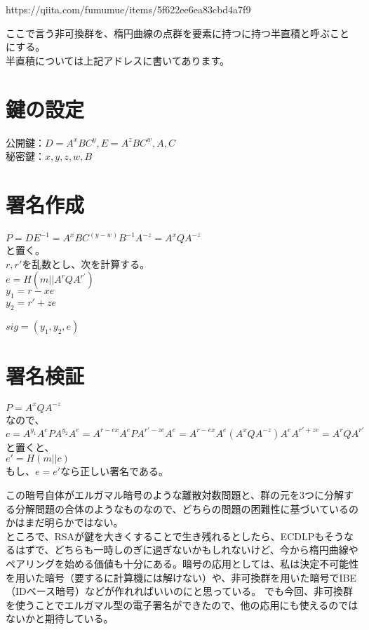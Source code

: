 \documentclass[
]{article}
\begin{document}
https://qiita.com/fumumue/items/5f622ee6ea83cbd4a7f9

ここで言う非可換群を、楕円曲線の点群を要素に持つに持つ半直積と呼ぶことにする。\\
半直積については上記アドレスに書いてあります。

\hypertarget{ux9375ux306eux8a2dux5b9a}{%
\section{鍵の設定}\label{ux9375ux306eux8a2dux5b9a}}

公開鍵：\(D=A^xBC^y,E=A^zBC^w,A,C\)\\
秘密鍵：\(x,y,z,w,B\)

\hypertarget{ux7f72ux540dux4f5cux6210}{%
\section{署名作成}\label{ux7f72ux540dux4f5cux6210}}

\(P=DE^{-1}=A^xBC^{(y-w)}B^{-1}A^{-z}=A^xQA^{-z}\)\\
と置く。\\
\(r,r'\)を乱数とし、次を計算する。\\
\(e=H(m||A^rQA^{r'})\)\\
\(y_1=r-xe\)\\
\(y_2=r'+ze\)

\(sig=(y_1,y_2,e)\)

\hypertarget{ux7f72ux540dux691cux8a3c}{%
\section{署名検証}\label{ux7f72ux540dux691cux8a3c}}

\(P=A^xQA^{-z}\)\\
なので、\\
\(c=A^{y_1}A^{e}PA^{y_2}A^{e}=A^{r-ex}A^{e}PA^{r'-ze}A^{e}=A^{r-ex}A^{e}(A^xQA^{-z})A^{e}A^{r'+ze}=A^rQA^{r'}\)\\
と置くと、\\
\(e'=H(m||c)\)\\
もし、\(e=e'\)なら正しい署名である。

この暗号自体がエルガマル暗号のような離散対数問題と、群の元を3つに分解する分解問題の合体のようなものなので、どちらの問題の困難性に基づいているのかはまだ明らかではない。\\
ところで、RSAが鍵を大きくすることで生き残れるとしたら、ECDLPもそうなるはずで、どちらも一時しのぎに過ぎないかもしれないけど、今から楕円曲線やペアリングを始める価値も十分にある。暗号の応用としては、私は決定不可能性を用いた暗号（要するに計算機には解けない）や、非可換群を用いた暗号でIBE（IDベース暗号）などが作れればいいのにと思っている。
でも今回、非可換群を使うことでエルガマル型の電子署名ができたので、他の応用にも使えるのではないかと期待している。
\end{document}
